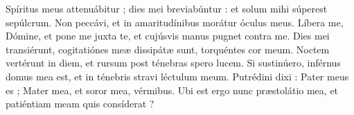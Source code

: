 
Spíritus meus attenuábitur ; dies mei breviabúntur : et solum mihi súperest sepúlcrum.
Non peccávi, et in amaritudínibus morátur óculus meus.
Líbera me, Dómine, et pone me juxta te, et cujúsvis manus pugnet contra me.
Dies mei transiérunt, cogitatiónes meæ dissipátæ sunt, torquéntes cor meum.
Noctem vertérunt in diem, et rursum post ténebras spero lucem.
Si sustinúero, inférnus domus mea est, et in ténebris stravi léctulum meum.
Putrédini dixi : Pater meus es ; Mater mea, et soror mea, vérmibus.
Ubi est ergo nunc præstolátio mea, et patiéntiam meam quis consíderat ?